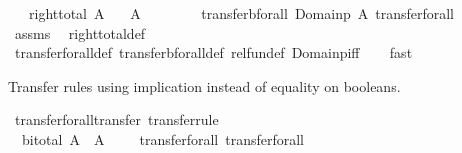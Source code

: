 \begin{isabellebody}
\ \ \ {\isachardoublequoteopen}right{\isacharunderscore}{\kern0pt}total\ A{\isachardoublequoteclose}\isanewline
\ \ \ {\isachardoublequoteopen}{\isacharparenleft}{\kern0pt}{\isacharparenleft}{\kern0pt}A\ {\isacharequal}{\kern0pt}{\isacharequal}{\kern0pt}{\isacharequal}{\kern0pt}{\isachargreater}{\kern0pt}\ {\isacharparenleft}{\kern0pt}{\isacharequal}{\kern0pt}{\isacharparenright}{\kern0pt}{\isacharparenright}{\kern0pt}\ {\isacharequal}{\kern0pt}{\isacharequal}{\kern0pt}{\isacharequal}{\kern0pt}{\isachargreater}{\kern0pt}\ {\isacharparenleft}{\kern0pt}{\isacharequal}{\kern0pt}{\isacharparenright}{\kern0pt}{\isacharparenright}{\kern0pt}\isanewline
\ \ \ \ {\isacharparenleft}{\kern0pt}transfer{\isacharunderscore}{\kern0pt}bforall\ {\isacharparenleft}{\kern0pt}Domainp\ A{\isacharparenright}{\kern0pt}{\isacharparenright}{\kern0pt}\ transfer{\isacharunderscore}{\kern0pt}forall{\isachardoublequoteclose}\isanewline
%
\isadelimproof
\ \ %
\endisadelimproof
%
\isatagproof
{}\isamarkupfalse%
\ assms\ \isamarkupfalse%
\ right{\isacharunderscore}{\kern0pt}total{\isacharunderscore}{\kern0pt}def\isanewline
\ \ \isamarkupfalse%
\ transfer{\isacharunderscore}{\kern0pt}forall{\isacharunderscore}{\kern0pt}def\ transfer{\isacharunderscore}{\kern0pt}bforall{\isacharunderscore}{\kern0pt}def\ rel{\isacharunderscore}{\kern0pt}fun{\isacharunderscore}{\kern0pt}def\ Domainp{\isacharunderscore}{\kern0pt}iff\isanewline
\ \ \isamarkupfalse%
\ fast%
\endisatagproof
{\isafoldproof}%
%
\isadelimproof
%
\endisadelimproof
%
\begin{isamarkuptext}%
Transfer rules using implication instead of equality on booleans.%
\end{isamarkuptext}\isamarkuptrue%
\isamarkupfalse%
\ transfer{\isacharunderscore}{\kern0pt}forall{\isacharunderscore}{\kern0pt}transfer\ {\isacharbrackleft}{\kern0pt}transfer{\isacharunderscore}{\kern0pt}rule{\isacharbrackright}{\kern0pt}{\isacharcolon}{\kern0pt}\isanewline
\ \ {\isachardoublequoteopen}bi{\isacharunderscore}{\kern0pt}total\ A\ {\isasymLongrightarrow}\ {\isacharparenleft}{\kern0pt}{\isacharparenleft}{\kern0pt}A\ {\isacharequal}{\kern0pt}{\isacharequal}{\kern0pt}{\isacharequal}{\kern0pt}{\isachargreater}{\kern0pt}\ {\isacharparenleft}{\kern0pt}{\isacharequal}{\kern0pt}{\isacharparenright}{\kern0pt}{\isacharparenright}{\kern0pt}\ {\isacharequal}{\kern0pt}{\isacharequal}{\kern0pt}{\isacharequal}{\kern0pt}{\isachargreater}{\kern0pt}\ {\isacharparenleft}{\kern0pt}{\isacharequal}{\kern0pt}{\isacharparenright}{\kern0pt}{\isacharparenright}{\kern0pt}\ transfer{\isacharunderscore}{\kern0pt}forall\ transfer{\isacharunderscore}{\kern0pt}forall{\isachardoublequoteclose}\isanewline

\end{isabellebody}
